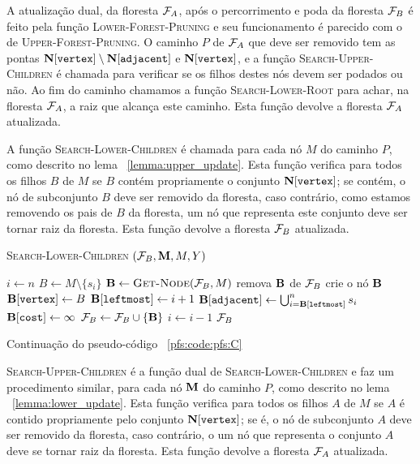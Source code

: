 A atualização dual, da floresta $\mathcal{F}_A$, após o percorrimento e 
poda da floresta $\mathcal{F}_B$ é feito pela função 
\textsc{Lower-Forest-Pruning} e seu funcionamento é parecido com o de
\textsc{Upper-Forest-Pruning}. O caminho $P$ de $\mathcal{F}_A$ que deve 
ser removido tem as pontas 
$\mathbf N[\texttt{vertex}] \setminus \mathbf N[\texttt{adjacent}]$
e $\mathbf N[\texttt{vertex}]$, e a função 
\textsc{Search-Upper-Children} é chamada para verificar se os filhos 
destes nós devem ser podados ou não. Ao fim do caminho chamamos a função 
\textsc{Search-Lower-Root} para achar, na floresta $\mathcal{F}_A$, a raiz
que alcança este caminho. Esta função devolve a floresta $\mathcal{F}_A$
atualizada.

A função \textsc{Search-Lower-Children} é chamada para cada nó $M$ do 
caminho $P$, como descrito no lema ~\ref{lemma:upper_update}. Esta 
função verifica para todos os filhos $B$ de $M$ se $B$ contém 
propriamente o conjunto $\mathbf N[\texttt{vertex}]$; se contém, o 
nó de subconjunto $B$ deve ser removido da floresta, caso 
contrário, como estamos removendo os pais de $B$ da floresta, um nó que
representa este conjunto deve ser tornar raiz da floresta. Esta função
devolve a floresta $\mathcal{F}_B$ atualizada.

\begin{algorithm}[H]
\textsc{Search-Lower-Children} $(\mathcal{F}_B, \mathbf M, M, Y)$
\begin{algorithmic}[1]
    \State $i \gets n$
        \State $B \gets M \setminus \{s_i\}$
            \State $\mathbf B \gets {\normalfont\textsc{Get-Node}} (\mathcal{F}_B, M)$
                \State remova $\mathbf B$ de $\mathcal{F}_B$
            \EndIf
        \Else
            \State crie o nó $\mathbf B$
            \State $\mathbf B[\texttt{vertex}] \gets B$
            \State $\mathbf B[\texttt{leftmost}] \gets i + 1$
            \State $\mathbf B[\texttt{adjacent}] \gets \bigcup_{i=\mathbf B[\texttt{leftmost}]}^{n} s_i$
            \State $\mathbf B[\texttt{cost}] \gets \infty$
            \State $\mathcal{F}_B \gets \mathcal{F}_B \cup \{\mathbf B\}$ 
        \EndIf
        \State $i \gets i - 1$
        \Return $\mathcal{F}_B$
    \EndWhile
\end{algorithmic}
\caption{Continuação do pseudo-código ~\ref{pfs:code:pfs:C}}
\label{pfs:code:pfs:D}
\end{algorithm}


\textsc{Search-Upper-Children} é a função dual de 
\textsc{Search-Lower-Children} e faz um procedimento similar, para 
cada nó $\mathbf M$ do caminho $P$, como descrito no lema 
~\ref{lemma:lower_update}. Esta função verifica para todos os filhos $A$
de $M$ se $A$ é contido propriamente pelo conjunto 
$\mathbf N[\texttt{vertex}]$; se é, o nó de subconjunto $A$ deve ser 
removido da floresta, caso contrário, o um nó que representa o conjunto 
$A$ deve se tornar raiz da floresta. Esta função devolve a floresta 
$\mathcal{F}_A$ atualizada.


